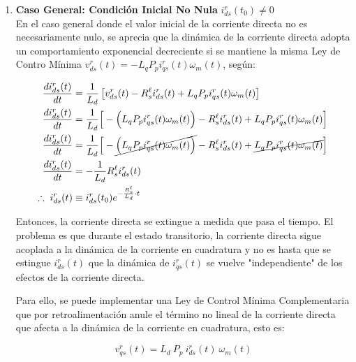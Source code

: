 \documentclass[blue,fullpaper]{ludusofficial}  %
\begin{document}
\begin{enumerate}
    Con la misma Ley de Control Mínima, se linealiza tanto la dinámica de la corriente directa como la dinámica de la corriente en cuadratura, siempre y cuando el valor inicial de la corriente directa sea nulo $i_{ds}^{r}(t_0) = 0$.

    \item \textbf{Caso General: Condición Inicial No Nula} $i_{ds}^{r}(t_0) \neq 0$ \\
    En el caso general donde el valor inicial de la corriente directa no es necesariamente nulo, se aprecia que la dinámica de la corriente directa adopta un comportamiento exponencial decreciente si se mantiene la misma Ley de Contro Mínima $v_{ds}^{r}(t)  = -L_{q}P_{p} i_{qs}^{r}(t) \omega_{m}(t)$, según:
    
    \begin{align*}
    \frac{di_{ds}^{r}(t)}{dt} & = \frac{1}{L_{d}} \left[v_{ds}^{r}(t) - R_{s}^{\ell} i_{ds}^{r}(t) + L_{q}P_{p} i_{qs}^{r}(t) \omega_{m}(t) \right]
    \\
    \frac{di_{ds}^{r}(t)}{dt} & = \frac{1}{L_{d}} \Big[ - \Big(  L_{q}P_{p} i_{qs}^{r}(t) \omega_{m}(t) \Big) - R_{s}^{\ell} i_{ds}^{r}(t) + L_{q}P_{p} i_{qs}^{r}(t) \omega_{m}(t) \Big]
    \\
    \frac{di_{ds}^{r}(t)}{dt} & = \frac{1}{L_{d}} \Big[ - \cancel{ \Big(  L_{q}P_{p} i_{qs}^{r}(t) \omega_{m}(t) \Big) } - R_{s}^{\ell} i_{ds}^{r}(t) + \cancel{ L_{q}P_{p} i_{qs}^{r}(t) \omega_{m}(t)  }\Big]  \\
    \frac{di_{ds}^{r}(t)}{dt} & = -\frac{1}{L_{d}} R_{s}^{\ell} i_{ds}^{r}(t) \\
     \therefore \; i_{ds}^{r}(t)  & \equiv i_{ds}^{r}(t_0) e^{ -\frac{ R_{s}^{\ell} }{L_{d}} \cdot t  }
    \end{align*}

    Entonces, la corriente directa se extingue a medida que pasa el tiempo. El problema es que durante el estado transitorio, la corriente directa sigue acoplada a la dinámica de la corriente en cuadratura y no es hasta que se estingue $i_{ds}^{r}(t)$ que la dinámica de $i_{qs}^{r}(t)$ se vuelve "independiente" de los efectos de la corriente directa.

    Para ello, se puede implementar una Ley de Control Mínima Complementaria que por retroalimentación anule el término no lineal de la corriente directa que afecta a la dinámica de la corriente en cuadratura, esto es:

    \begin{equation}
        v_{qs}^{r}(t) =   L_{d} \ P_{p} \ i_{ds}^{r}(t) \ \omega_{m}(t)
    \end{equation}


\end{enumerate}
\end{document}
